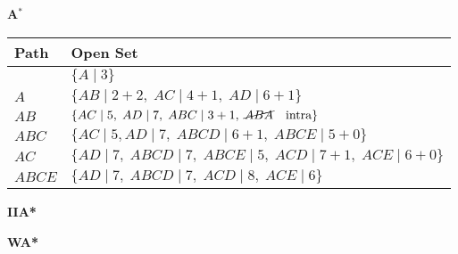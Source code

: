 \begin{example} \textbf{A$^*$}
    \begin{center}
        \begin{tabular}{ll}
        \toprule
        \textbf{Path} & \textbf{Open Set} \\
        \midrule
         & $\{A \mid 3 \}$ \\
        $A$ & $\{AB \mid 2 + 2, \; AC \mid 4 + 1, \; AD \mid 6 + 1\}$ \\
        $AB$ & $\{AC \mid 5, \; AD \mid 7, \; ABC \mid 3 + 1, \; \cancel{ABA} \quad \text{intra} \}$ \\
        $ABC$ & $\{AC \mid 5, AD \mid 7, \; ABCD \mid 6 + 1, \; ABCE \mid 5 + 0 \}$ \\
        $AC$ & $\{AD \mid 7, \; ABCD \mid 7, \; ABCE \mid 5, \; ACD \mid 7 + 1, \; ACE \mid 6 + 0 \}$ \\
        $ABCE$ & $\{AD \mid 7, \; ABCD \mid 7, \; ACD \mid 8, \; ACE \mid 6 \}$ \\
        \bottomrule
        \end{tabular}
    \end{center}
\end{example}

\begin{example} \textbf{IIA*}
    
\end{example}

\begin{example} \textbf{WA*}
    
\end{example}
\newpage

